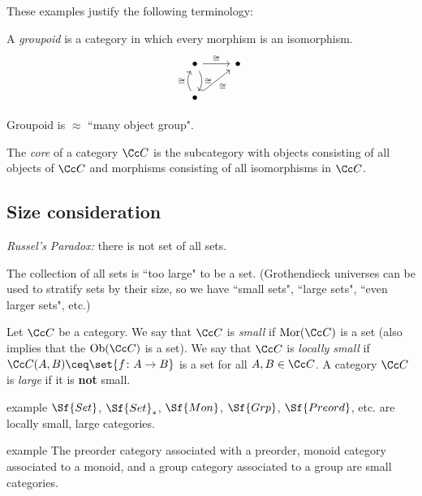 \documentclass[class=article, crop=false]{standalone}
\begin{document}
These examples justify the following terminology:
\begin{defn}
  A \emph{groupoid} is a category in which every morphism is an isomorphism.
    \[
    \begin{tikzcd}
      \bullet \arrow[r, "\cong"] \arrow[d, "\cong", bend left]   & \bullet \\
      \bullet \arrow[u, "\cong", bend left] \arrow[ru, "\cong"'] &
    \end{tikzcd}
    \]
\end{defn}
\begin{rem}
  Groupoid is $\approx$ ``many object group".
\end{rem}

\begin{defn}
  The \emph{core} of a category $\Cc C$ is the subcategory with objects consisting of all objects of $\Cc C$ and morphisms consisting of all isomorphisms in $\Cc C$.
\end{defn}

\subsection*{Size consideration}

\emph{Russel's Paradox:} there is not set of all sets.

The collection of all sets is ``too large" to be a set. (Grothendieck universes can be used to stratify sets by their size, so we have ``small sets", ``large sets", ``even larger sets", etc.)

\begin{defn}
  Let $\Cc C$ be a category. We say that $\Cc C$ is \emph{small} if $\operatorname{Mor}(\Cc C)$ is a set (also implies that the $\operatorname{Ob}(\Cc C)$ is a set). We say that $\Cc C$ is \emph{locally small} if $\Cc C(A,B) \ceq \set{f\colon A \to B}$ is a set for all $A,B\in \Cc C$. A category $\Cc C$ is \emph{large} if it is \textbf{not} small.
\end{defn}

\begin{understandingcheck}{example}
  $\Sf{Set}$, $\Sf{Set}_*$, $\Sf{Mon}$, $\Sf{Grp}$, $\Sf{Preord}$, etc. are locally small, large categories.
\end{understandingcheck}

\begin{understandingcheck}{example}
  The preorder category associated with a preorder, monoid category associated to a monoid, and a group category associated to a group are small categories.
\end{understandingcheck}
\end{document}
